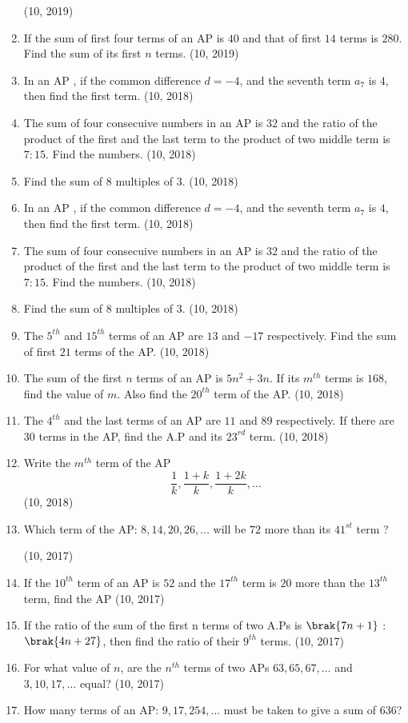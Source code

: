 \begin{enumerate}[label=\thesubsection.\arabic*,ref=\thesubsection.\theenumi,itemsep=1pt]
\hfill (10, 2019) \item If the sum of first four terms of an  AP  is $40$ and that of first $14$ terms is $280$. Find the sum of its first $n$ terms.
\hfill (10, 2019)
%
			 \item In an  AP , if the common difference $d = -4$, and the seventh term $a_7$ is $4$, then find the first term.		
			\hfill (10, 2018) \item The sum of four consecuive numbers in an AP is $32$ and the ratio of the product of the first and the last term to the product of two middle term is $7:15$. Find the numbers.
	\hfill (10, 2018) \item Find the sum of $8$ multiples of $3$.
\hfill (10, 2018)
%
			 \item In an  AP , if the common difference $d = -4$, and the seventh term $a_7$ is $4$, then find the first term.		
			\hfill (10, 2018) \item The sum of four consecuive numbers in an AP is $32$ and the ratio of the product of the first and the last term to the product of two middle term is $7:15$. Find the numbers.
%
	\hfill (10, 2018) \item Find the sum of $8$ multiples of $3$.
\hfill (10, 2018)
 \item The $5^{th}$ and $15^{th}$ terms of an AP are $13$ and $-17$ respectively. Find the sum of first $21$ terms of the AP.
\hfill (10, 2018)
%
 \item The sum of the first $n$ terms of an AP is $5n^{2}+3n$. If its $m^{th}$ terms is $168$, find the value of $m$. Also find the $20^{th}$ term of the AP.
\hfill (10, 2018) \item The $4^{th}$ and the last terms of an AP are $11$ and $89$ respectively. If there are $30$ terms in the AP, find the A.P and its $23^{rd}$ term.
\hfill (10, 2018) \item Write the $m^{th}$ term of the AP $$\frac{1}{k},\dfrac{1+k}{k},\dfrac{1+2k}{k},\dots$$
\hfill (10, 2018)
 \item Which term of the AP: $8,14,20,26,\dots$ will be $72$ more than its $41^{st}$ term ?

\hfill (10, 2017) \item If the $10^{th}$ term of an AP is $52$ and the $17^{th}$ term is $20$ more than the $13^{th}$ term, find the AP
\hfill (10, 2017) \item If the ratio of the sum of the first n terms of two A.Ps is $\brak{7n + 1}$ : $\brak{4n + 27}$, then find the ratio of their $9^{th}$ terms.
\hfill (10, 2017) \item For what value of $n$, are the $n^{th}$ terms of two APs $63,65,67,\dots$ and $3,10, 17,\dots$ equal?
\hfill (10, 2017) \item How many terms of an AP: $9,17,254,\dots$ must be taken to  give a sum of $636$?


\end{enumerate}
